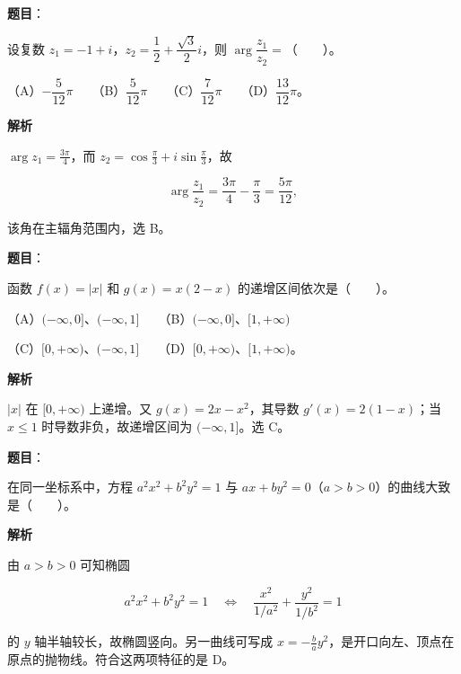 \begin{answer}

\textbf{题目}：

设复数 $z_1=-1+i$，$z_2=\dfrac12+\dfrac{\sqrt3}{2}i$，则 $\arg\dfrac{z_1}{z_2}=$\mbox{（　　）}。

（A）$-\dfrac5{12}\pi$　　（B）$\dfrac5{12}\pi$　　（C）$\dfrac7{12}\pi$　　（D）$\dfrac{13}{12}\pi$。

\textbf{解析}

$\arg z_1=\frac{3\pi}{4}$，而 $z_2=\cos\frac\pi3+i\sin\frac\pi3$，故

\nopagebreak[4]
\[
\arg\frac{z_1}{z_2}
=\frac{3\pi}{4}-\frac\pi3
=\frac{5\pi}{12},
\]

该角在主辐角范围内，选 B。


\end{answer}
\begin{answer}

\textbf{题目}：

函数 $f(x)=|x|$ 和 $g(x)=x(2-x)$ 的递增区间依次是\mbox{（　　）}。

（A）$(-\infty,0]$、$(-\infty,1]$　　（B）$(-\infty,0]$、$[1,+\infty)$

（C）$[0,+\infty)$、$(-\infty,1]$　　（D）$[0,+\infty)$、$[1,+\infty)$。

\textbf{解析}

$|x|$ 在 $[0,+\infty)$ 上递增。又 $g(x)=2x-x^2$，其导数 $g'(x)=2(1-x)$；当 $x\leqslant1$ 时导数非负，故递增区间为 $(-\infty,1]$。选 C。


\end{answer}
\begin{answer}

\textbf{题目}：

在同一坐标系中，方程 $a^2x^2+b^2y^2=1$ 与 $ax+by^2=0$（$a>b>0$）的曲线大致是\mbox{（　　）}。
\nopagebreak[4]
\begin{center}\end{center}
\nopagebreak[4]
\textbf{解析}

由 $a>b>0$ 可知椭圆

\nopagebreak[4]
\[
a^2x^2+b^2y^2=1
\quad\Longleftrightarrow\quad
\frac{x^2}{1/a^2}+\frac{y^2}{1/b^2}=1
\]

的 $y$ 轴半轴较长，故椭圆竖向。另一曲线可写成 $x=-\frac ba y^2$，是开口向左、顶点在原点的抛物线。符合这两项特征的是 D。


\end{answer}
